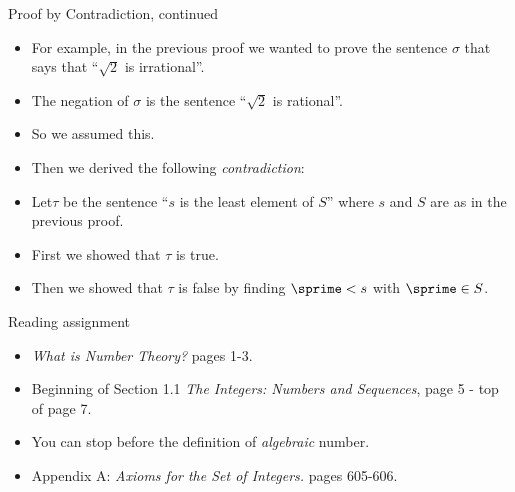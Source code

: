 \documentclass[handout]{beamer}
\begin{document}
\begin{frame}{Proof by Contradiction, continued}
\begin{itemize}
\item For example, in the previous proof we wanted to prove the sentence
$\sigma$ that says that ``$\sqrt{2}$ is irrational''.
\item The negation of $\sigma$ is  the sentence ``$\sqrt{2}$ is rational''.
\item So we assumed this.
\item Then we derived the following \emph{contradiction}:
\item Let$\tau$ be the sentence
``$s$ is the least element of $S$'' where $s$ and $S$ are as in the previous proof.
\item First we showed that $\tau$ is true.
\item Then we showed that $\tau$ is false by finding $\sprime<s$
with $\sprime\in S$.
\end{itemize}
\end{frame}

\begin{frame}{Reading assignment}

\begin{itemize}
  \item \emph{What is Number Theory?} pages 1-3.
  \item Beginning of Section 1.1 \emph{The Integers: Numbers and Sequences},
  page 5 - top of page 7.
  \item You can stop before the definition of \emph{algebraic} number.
  \item Appendix A: \emph{Axioms for the Set of Integers.} pages 605-606.
\end{itemize}

\end{frame}
\end{document}
